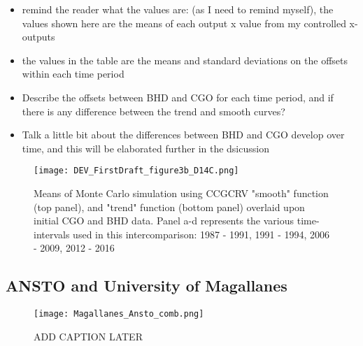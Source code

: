 \documentclass{BrJG_submit}
\begin{document}
\begin{itemize}
	\item remind the reader what the values are: (as I need to remind myself), the values shown here are the means of each output x value from my controlled x-outputs
	\item the values in the table are the means and standard deviations on the offsets within each time period
	\item Describe the offsets between BHD and CGO for each time period, and if there is any difference between the trend and smooth curves? 
	\item Talk a little bit about the differences between BHD and CGO develop over time, and this will be elaborated further in the dsicussion
\end{itemize}













































\begin{figure}[h!]
  \texttt{[image: DEV\_FirstDraft\_figure3b\_D14C.png]}
  \caption{Means of Monte Carlo simulation using CCGCRV "smooth" function (top panel), and "trend" function (bottom panel) overlaid upon initial CGO and BHD data. Panel a-d represents the various time-intervals used in this intercomparison: 1987 - 1991, 1991 - 1994, 2006 - 2009, 2012 - 2016}
  \label{fig:results1}
\end{figure}


\newpage
\subsection{ANSTO and University of Magallanes}
\begin{figure}[h!]
  \texttt{[image: Magallanes\_Ansto\_comb.png]}
  \caption{ADD CAPTION LATER}
  \label{fig:results1}
\end{figure}
\end{document}
